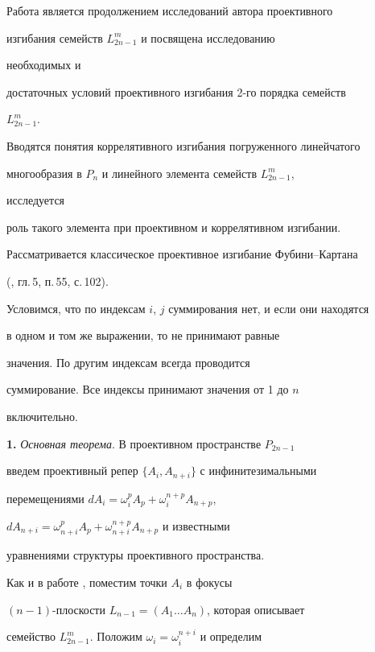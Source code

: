 Работа является продолжением исследований автора проективного 


изгибания семейств $L^m_{2n-1}$ \cite{1} и посвящена исследованию 


необходимых и 


достаточных условий проективного изгибания 2-го порядка семейств 


$L^m_{2n-1}$. 


Вводятся понятия коррелятивного изгибания погруженного линейчатого 


многообразия в $P_n$ и линейного элемента семейств $L^m_{2n-1}$, 


исследуется 


роль такого элемента при проективном и коррелятивном изгибании. 


Рассматривается классическое проективное изгибание Фубини--Картана 


(\cite{2}, гл.\,5, п.\,55, с.\,102). 


 


Условимся, что по индексам $i$, $j$ суммирования нет, и если они находятся 


в одном и том же выражении, то не принимают равные 


значения. По другим индексам всегда проводится 


суммирование. Все индексы принимают значения от 1 до $n$ 


включительно. 


\medskip 


 


{\bf 1.} {\it Основная теорема}. В проективном пространстве $P_{2n-1}$ 


введем проективный репер $\{A_i,A_{n+i}\}$ с инфинитезимальными 


перемещениями $dA_i=\omega^p_i A_p+\omega^{n+p}_i A_{n+p}$, 


$dA_{n+i}=\omega^p_{n+i}A_p+\omega^{n+p}_{n+i}A_{n+p}$ и известными 


уравнениями структуры проективного пространства. 


 


Как и в работе \cite{1}, поместим точки $A_i$ в фокусы 


$(n-1)$-плоскости $L_{n-1}=(A_1\dotsc A_n)$, которая описывает 


семейство $L^m_{2n-1}$. Положим $\omega_i=\omega^{n+i}_i$ и определим 


